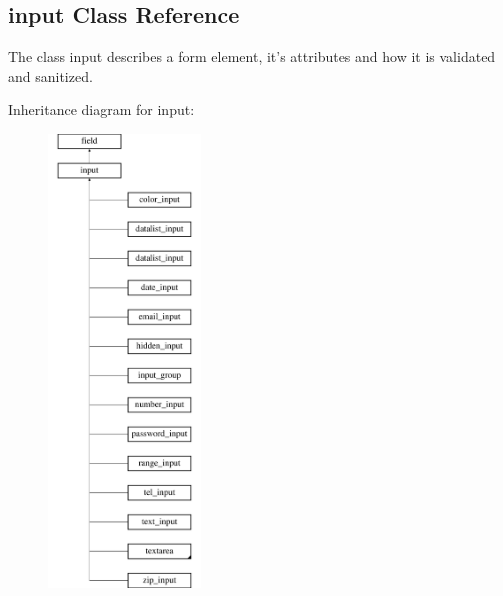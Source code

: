 \hypertarget{classinput}{\subsection{input Class Reference}
\label{classinput}
}


The class input describes a form element, it's attributes and how it is validated and sanitized.  


Inheritance diagram for input\-:\begin{figure}[H]
\begin{center}
\leavevmode
\includegraphics[height=12.000000cm]{classinput}
\end{center}
\end{figure}

